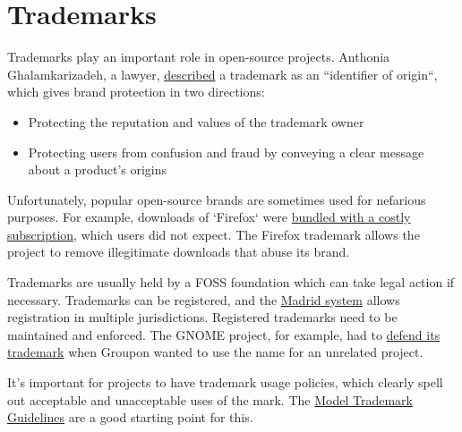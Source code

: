 


\chapter{Trademarks}

Trademarks play an important role in open-source projects.  Anthonia Ghalamkarizadeh, a lawyer, \href{https://lwn.net/Articles/546678/}{described} a trademark as an ``identifier of origin``, which gives brand protection in two directions:

\begin{itemize}

\item Protecting the reputation and values of the trademark owner

\item Protecting users from confusion and fraud by conveying a clear message about a product's origins

\end{itemize}

Unfortunately, popular open-source brands are sometimes used for nefarious purposes.  For example, downloads of `Firefox` were \href{https://lwn.net/Articles/546678/}{bundled with a costly subscription}, which users did not expect.  The Firefox trademark allows the project to remove illegitimate downloads that abuse its brand.

Trademarks are usually held by a FOSS foundation which can take legal action if necessary.  Trademarks can be registered, and the \href{https://en.wikipedia.org/wiki/Madrid_system}{Madrid system} allows registration in multiple jurisdictions.  Registered trademarks need to be maintained and enforced.  The GNOME project, for example, had to \href{https://lwn.net/Articles/654124/}{defend its trademark} when Groupon wanted to use the name for an unrelated project.

It's important for projects to have trademark usage policies, which clearly spell out acceptable and unacceptable uses of the mark.  The \href{http://modeltrademarkguidelines.org/}{Model Trademark Guidelines} are a good starting point for this.


